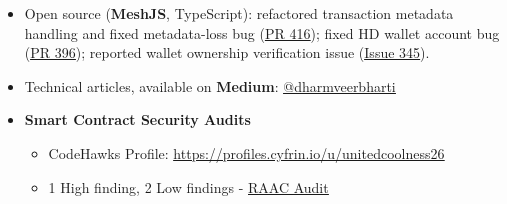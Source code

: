 \documentclass[]{resume-openfont}
\newcommand{\weblink}[2]{\href{#2}{\underline{#1}}}
\begin{document}
\begin{itemize}
    \item Open source (\textbf{MeshJS}, TypeScript): refactored transaction metadata handling and fixed metadata-loss bug (\weblink{PR 416}{https://github.com/MeshJS/mesh/pull/416}); fixed HD wallet account bug (\weblink{PR 396}{https://github.com/MeshJS/mesh/pull/396}); reported wallet ownership verification issue (\weblink{Issue 345}{https://github.com/MeshJS/mesh/issues/345}).
    \item Technical articles, available on \textbf{Medium}: \weblink{@dharmveerbharti}{https://medium.com/@dharmveerbharti}
    \item \textbf{Smart Contract Security Audits}
    \begin{itemize}
        \item CodeHawks Profile: \weblink{https://profiles.cyfrin.io/u/unitedcoolness26}{https://profiles.cyfrin.io/u/unitedcoolness26}
        \item 1 High finding, 2 Low findings - \weblink{RAAC Audit}{https://codehawks.cyfrin.io/c/2025-02-raac}
    \end{itemize}

\end{itemize}
\end{document}
